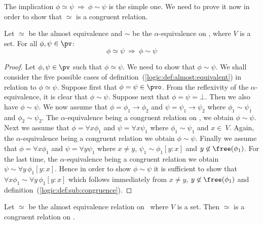 The implication $\phi\simeq\psi\ \Rightarrow\ \phi\sim\psi$ is the
simple one. We need to prove it now in order to show that $\simeq$
is a congruent relation.

\begin{prop}\label{logic:prop:almost:implies:sub:congruence}
Let $\simeq$ be the almost equivalence and $\sim$ be the 
$\alpha$-equivalence on \pv, where $V$ is a set. For all
$\phi,\psi\in\pv$:
    \[
    \phi\simeq\psi\ \Rightarrow\ \phi\sim\psi
    \]
\end{prop}

\noindent
\begin{proof}
Let $\phi,\psi\in\pv$ such that $\phi\simeq\psi$. We need to show
that $\phi\sim\psi$. We shall consider the five possible cases of
definition~(\ref{logic:def:almost:equivalent}) in relation to
$\phi\simeq\psi$. Suppose first that $\phi=\psi\in\pvo$. From the
reflexivity of the $\alpha$-equivalence, it is clear that
$\phi\sim\psi$. Suppose next that $\phi=\psi=\bot$. Then we also
have $\phi\sim\psi$. We now assume that $\phi=\phi_{1}\to\phi_{2}$
and $\psi=\psi_{1}\to\psi_{2}$ where $\phi_{1}\sim\psi_{1}$ and
$\phi_{2}\sim\psi_{2}$. The $\alpha$-equivalence being a
congruent relation on \pv, we obtain $\phi\sim\psi$. Next we assume
that $\phi=\forall x\phi_{1}$ and $\psi=\forall x\psi_{1}$ where
$\phi_{1}\sim\psi_{1}$ and $x\in\ V$. Again, the $\alpha$-equivalence 
being a congruent relation we obtain $\phi\sim\psi$.
Finally we assume that $\phi=\forall x\phi_{1}$ and $\psi=\forall
y\psi_{1}$ where $x\neq y$, $\psi_{1}\sim\phi_{1}[y\!:\!x]$ and
$y\not\in\free(\phi_{1})$. For the last time, the $\alpha$-equivalence 
being a congruent relation we obtain $\psi\sim \forall
y\, \phi_{1}[y\!:\!x]$. Hence in order to show $\phi\sim\psi$ it is
sufficient to show that $\forall x\phi_{1}\sim\forall
y\,\phi_{1}[y\!:\!x]$ which follows immediately from $x\neq y$,
$y\not\in\free(\phi_{1})$ and
definition~(\ref{logic:def:sub:congruence}).
\end{proof}

\begin{prop}\label{logic:prop:almost:congruent}
Let $\simeq$ be the almost equivalence relation on \pv\ where $V$ is
a set. Then $\simeq$ is a congruent relation on \pv.
\end{prop}

